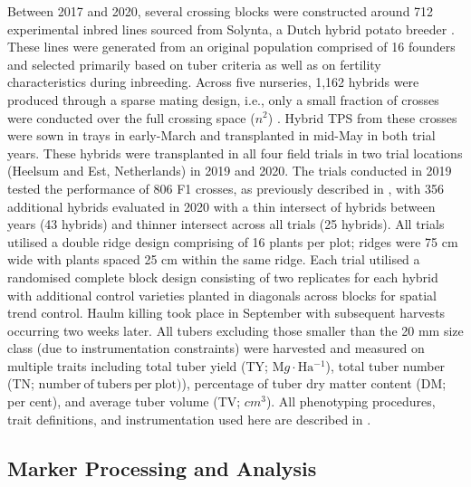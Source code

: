 Between 2017 and 2020, several crossing blocks were constructed around 712 experimental inbred lines sourced from Solynta, a Dutch hybrid potato breeder \parencite{Lindhout2018}. These lines were generated from an original population comprised of 16 founders and selected primarily based on tuber criteria as well as on fertility characteristics during inbreeding. Across five nurseries, 1,162 hybrids were produced through a sparse mating design, i.e., only a small fraction of crosses were conducted over the full crossing space (\(n^2\)) \parencite{Wang2020}. Hybrid TPS from these crosses were sown in trays in early-March and transplanted in mid-May in both trial years. These hybrids were transplanted in all four field trials in two trial locations (Heelsum and Est, Netherlands) in 2019 and 2020. The trials conducted in 2019 tested the performance of 806 F1 crosses, as previously described in \parencite{Adams2022}, with 356 additional hybrids evaluated in 2020 with a thin intersect of hybrids between years (43 hybrids) and thinner intersect across all trials (25 hybrids). All trials utilised a double ridge design comprising of 16 plants per plot; ridges were 75 cm wide with plants spaced 25 cm within the same ridge. Each trial utilised a randomised complete block design consisting of two replicates for each hybrid with additional control varieties planted in diagonals across blocks for spatial trend control. Haulm killing took place in September with subsequent harvests occurring two weeks later. All tubers excluding those smaller than the 20 mm size class (due to instrumentation constraints) were harvested and measured on multiple traits including total tuber yield (TY; \(\mathrm Mg \cdot \mathrm{Ha^{-1}}\)), total tuber number (TN; \(\mathrm{number~of~tubers~per~plot)}\)), percentage of tuber dry matter content (DM; per cent), and average tuber volume (TV; \(cm^3\)). All phenotyping procedures, trait definitions, and instrumentation used here are described in \parencite{Stockem2020}.

\subsection{Marker Processing and Analysis}

